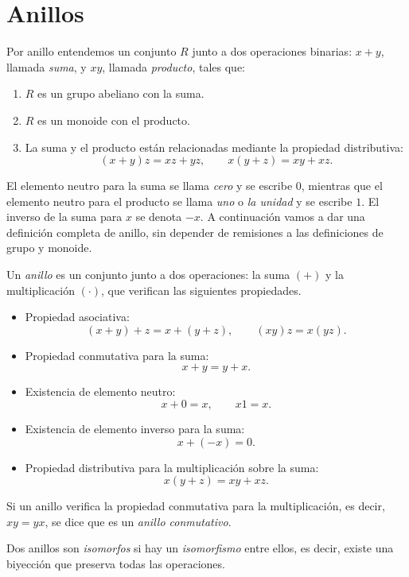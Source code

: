 \section{Anillos}

Por anillo entendemos un conjunto \(R\) junto a dos operaciones binarias: \(x + y\), llamada \textit{suma}, y \(xy\), llamada \textit{producto}, tales que:

\begin{enumerate}
  \item \(R\) es un grupo abeliano con la suma.
  \item \(R\) es un monoide con el producto.
  \item La suma y el producto están relacionadas mediante la propiedad distributiva:
  \[
    (x+y)z = xz + yz, \qquad x(y+z) = xy + xz.
  \]
\end{enumerate}

El elemento neutro para la suma se llama \textit{cero} y se escribe \(0\), mientras que el elemento neutro para el producto se llama \textit{uno} o \textit{la unidad} y se escribe \(1\).
El inverso de la suma para \(x\) se denota \(-x\).
A continuación vamos a dar una definición completa de anillo, sin depender de remisiones a las definiciones de grupo y monoide.

\begin{definition}
  Un \textit{anillo} es un conjunto junto a dos operaciones: la suma \((+)\) y la multiplicación \((\cdot)\), que verifican las siguientes propiedades.
  \begin{itemize}[itemsep=0pt]
    \item Propiedad asociativa:
    \[(x+y)+z = x + (y+z), \qquad (xy)z = x(yz).\]
    \item Propiedad conmutativa para la suma:
    \[x + y = y + x.\]
    \item Existencia de elemento neutro:
    \[x + 0 = x, \qquad x1 = x.\]
    \item Existencia de elemento inverso para la suma:
    \[x + (-x) = 0.\]
    \item Propiedad distributiva para la multiplicación sobre la suma:
    \[x(y+z) = xy + xz.\]
  \end{itemize}

  Si un anillo verifica la propiedad conmutativa para la multiplicación, es decir, \(xy = yx\), se dice que es un \textit{anillo conmutativo}.
\end{definition}

Dos anillos son \textit{isomorfos} si hay un \textit{isomorfismo} entre ellos, es decir, existe una biyección que preserva todas las operaciones.

